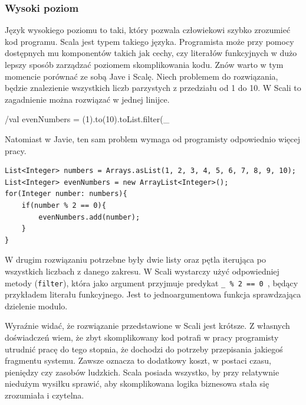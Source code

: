 \documentclass[brudnopis]{xmgr}
\begin{document}
\inputminted[fontsize=\small,label=Person.java,frame=single,framerule=0pt,framesep=2pt]{java}{code/person.java}

\inputminted[fontsize=\small,label=Person.scala,frame=single,framerule=0pt,framesep=2pt]{scala}{code/person.scala}

\subsubsection{Wysoki poziom}

Język wysokiego poziomu to taki, który pozwala człowiekowi szybko zrozumieć kod programu. Scala jest typem takiego języka. Programista może przy pomocy dostępnych mu komponentów takich jak cechy, czy literałów funkcyjnych w dużo lepszy sposób zarządzać poziomem skomplikowania kodu. Znów warto w tym momencie porównać ze sobą Jave i Scalę. Niech problemem do rozwiązania, będzie znalezienie wszystkich liczb parzystych z przedziału od 1 do 10. W Scali to zagadnienie można rozwiązać w jednej linijce.

/val evenNumbers = (1).to(10).toList.filter(_ %

Natomiast w Javie, ten sam problem wymaga od programisty odpowiednio więcej pracy.

\begin{verbatim}
List<Integer> numbers = Arrays.asList(1, 2, 3, 4, 5, 6, 7, 8, 9, 10);
List<Integer> evenNumbers = new ArrayList<Integer>();
for(Integer number: numbers){
    if(number % 2 == 0){
        evenNumbers.add(number);
    }
}
\end{verbatim}

W drugim rozwiązaniu potrzebne były dwie listy oraz pętla iterująca po wszystkich liczbach z danego zakresu. W Scali wystarczy użyć odpowiedniej metody (\texttt{filter}), która jako argument przyjmuje predykat \texttt{\_ \% 2 == 0 }, będący przykładem literału funkcyjnego. Jest to jednoargumentowa funkcja sprawdzająca dzielenie modulo.

Wyraźnie widać, że rozwiązanie przedstawione w Scali jest krótsze. Z własnych doświadczeń wiem, że zbyt skomplikowany kod potrafi w pracy programisty utrudnić pracę do tego stopnia, że dochodzi do potrzeby przepisania jakiegoś fragmentu systemu. Zawsze oznacza to dodatkowy koszt, w postaci czasu, pieniędzy czy zasobów ludzkich. Scala posiada wszystko, by przy relatywnie niedużym wysiłku sprawić, aby skomplikowana logika biznesowa stała się zrozumiała i czytelna.
\end{document}
